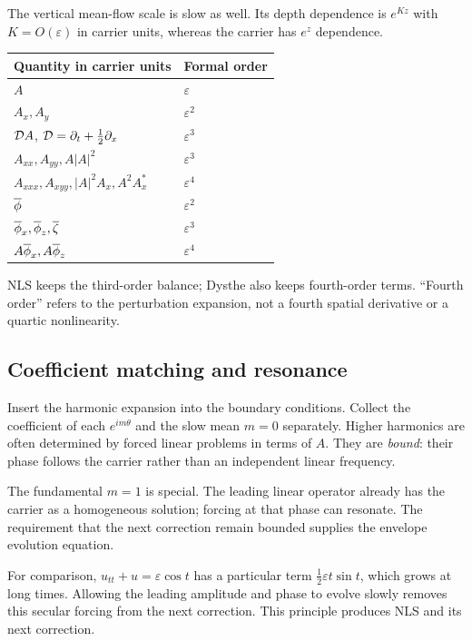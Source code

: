 The vertical mean-flow scale is slow as well. Its depth dependence is
$e^{Kz}$ with $K=O(\varepsilon)$ in carrier units, whereas the carrier
has $e^z$ dependence.

\begin{center}
\begin{tabular}{@{}ll@{}}
\toprule Quantity in carrier units & Formal order\\\midrule
$A$ & $\varepsilon$\\
$A_x,A_y$ & $\varepsilon^2$\\
$\mathcal{D} A$, $\mathcal{D}=\partial_t+\tfrac12\partial_x$ & $\varepsilon^3$\\
$A_{xx},A_{yy},A|A|^2$ & $\varepsilon^3$\\
$A_{xxx},A_{xyy},|A|^2A_x,A^2A_x^*$ & $\varepsilon^4$\\
$\overline{\phi}$ & $\varepsilon^2$\\
$\overline{\phi}_x,\overline{\phi}_z,\overline{\zeta}$ & $\varepsilon^3$\\
$A\overline{\phi}_x,A\overline{\phi}_z$ & $\varepsilon^4$\\\bottomrule
\end{tabular}
\end{center}

NLS keeps the third-order balance; Dysthe also keeps fourth-order terms.
``Fourth order'' refers to the perturbation expansion, not a fourth
spatial derivative or a quartic nonlinearity.

\subsection{Coefficient matching and resonance}
Insert the harmonic expansion into the boundary conditions. Collect the
coefficient of each $e^{im\theta}$ and the slow mean $m=0$ separately.
Higher harmonics are often determined by forced linear problems in terms
of $A$. They are \emph{bound}: their phase follows the carrier rather than
an independent linear frequency.

The fundamental $m=1$ is special. The leading linear operator already has
the carrier as a homogeneous solution; forcing at that phase can resonate.
The requirement that the next correction remain bounded supplies the
envelope evolution equation.

For comparison, $u_{tt}+u=\varepsilon\cos t$ has a particular term
$\tfrac12\varepsilon t\sin t$, which grows at long times. Allowing the
leading amplitude and phase to evolve slowly removes this secular forcing
from the next correction. This principle produces NLS and its next correction.

